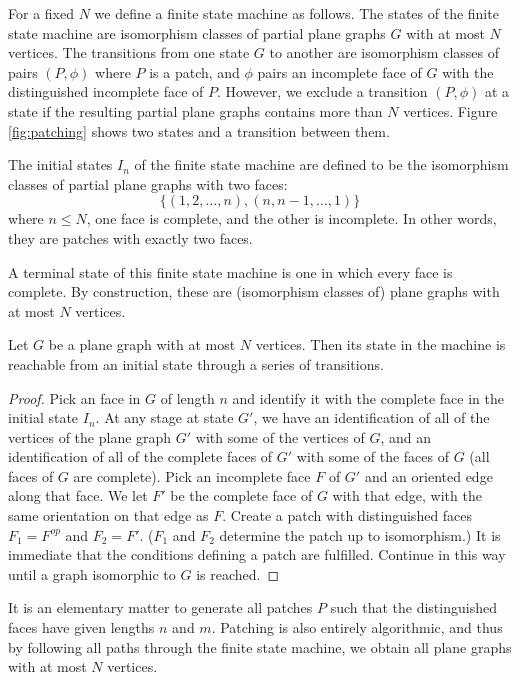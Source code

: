 For a fixed $N$ we define a finite state machine as follows. The
states of the finite state machine are isomorphism classes of
partial plane graphs $G$ with at most $N$ vertices. The
transitions from one state $G$ to another are isomorphism classes
of pairs $(P,\phi)$ where $P$ is a patch, and $\phi$ pairs an
incomplete face of $G$ with the distinguished incomplete face of
$P$. However, we exclude a transition $(P,\phi)$ at a state if the
resulting partial plane graphs contains more than $N$ vertices.
Figure \ref{fig:patching} shows two states and a transition
between them.

The initial states $I_n$ of the finite state machine are defined
to be the isomorphism classes of partial plane graphs with two
faces:
    $$\{(1,2,\ldots,n),(n,n-1,\ldots,1)\}$$
where $n\le N$, one face is complete, and the other is incomplete.
In other words, they are patches with exactly two faces.

A terminal state of this finite state machine is one in which
every face is complete.  By construction, these are (isomorphism
classes of) plane graphs with at most $N$ vertices.

\begin{lemma}
    \label{lemma:reachable}
Let $G$ be a plane graph with at most $N$ vertices. Then its state
in the machine is reachable from an initial state through a series
of transitions.
\end{lemma}

\begin{proof}  Pick an face in $G$ of length $n$ and identify it with
the complete face in the initial state $I_n$. At any stage at
state $G'$, we have an identification of all of the vertices of
the plane graph $G'$ with some of the vertices of $G$, and an
identification of all of the complete faces of $G'$ with some of
the faces of $G$ (all faces of $G$ are complete). Pick an
incomplete face $F$ of $G'$ and an oriented edge along that face.
We let $F'$ be the complete face of $G$ with that edge, with the
same orientation on that edge as $F$. Create a patch with
distinguished faces $F_1 = F^{op}$ and $F_2 = F'$. ($F_1$ and
$F_2$ determine the patch up to isomorphism.) It is immediate that
the conditions defining a patch are fulfilled. Continue in this
way until a graph isomorphic to $G$ is reached.
\end{proof}

\begin{remark}
It is an elementary matter to generate all patches $P$ such that
the distinguished faces have given lengths $n$ and $m$. Patching
is also entirely algorithmic, and thus by following all paths
through the finite state machine, we obtain all plane graphs with
at most $N$ vertices.
\end{remark}

